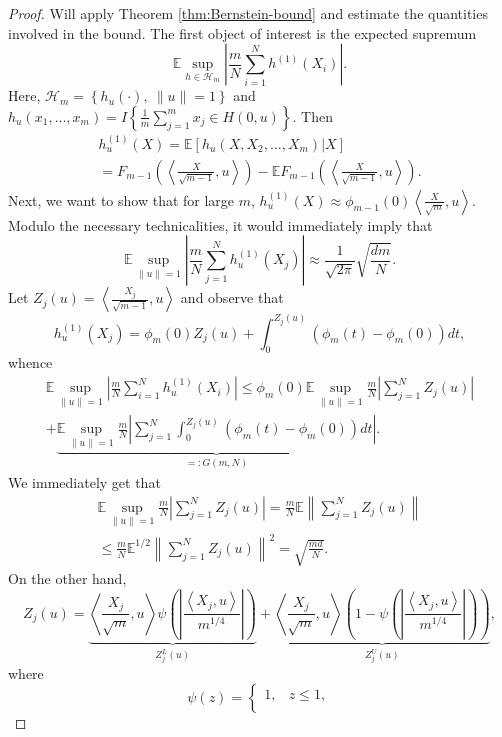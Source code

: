 \documentclass[12pt]{article}
\def\l{\left}
\def\r{\right}
\newcommand{\m}{\mathcal}
\newcommand{\mb}{\mathbb}
\newcommand{\dotp}[2]{\left\langle#1,#2\right\rangle}
\theoremstyle{thmstyletwo}%
\theoremstyle{thmstylethree}%
\begin{document}
\begin{proof}
    Will apply Theorem \ref{thm:Bernstein-bound} and estimate the quantities involved in the bound. The first object of interest is the expected supremum
    \[
    \mb E\sup_{h\in \m H_m}\l|\frac{m}{N} \sum_{i=1}^N h^{(1)}\l(X_i\r)\r|. 
    \]
    Here, $\m H_m = \l\{ h_u(\cdot), \ \|u\|=1\r\}$ and $h_u(x_1,\ldots,x_m) = I\l\{\frac{1}{m}\sum_{j=1}^m x_j\in H(0,u) \r\}$. Then 
    \begin{multline*}
    h^{(1)}_u(X) = \mb E\l[ h_u(X,X_2,\ldots,X_m) | X\r]
    \\
    = F_{m-1}\l( \dotp{\frac{X}{\sqrt{m-1}}}{u}\r) - \mb E F_{m-1}\l( \dotp{\frac{X}{\sqrt{m-1}}}{u}\r).
    \end{multline*}
    Next, we want to show that for large $m$, $h^{(1)}_u(X) \approx \phi_{m-1}(0)\dotp{\frac{X}{\sqrt m}}{u}$. Modulo the necessary technicalities, it would immediately imply that 
    \[
    \mb E\sup_{\|u\|=1} \l|\frac{m}{N} \sum_{j=1}^N h_u^{(1)}\l(X_j\r)\r| \approx \frac{1}{\sqrt{2\pi}}\sqrt{\frac{dm}{N}}.
    \]
    Let $Z_j(u) = \dotp{\frac{X_j}{\sqrt{m-1}}}{u}$ and observe that 
    \[
    h_u^{(1)}(X_j) = \phi_m(0) Z_j(u) + \int_0^{Z_j(u)} (\phi_m(t) - \phi_m(0))dt,
    \]
    whence 
    \begin{multline*}
    \mb E\sup_{\|u\|=1}\l|\frac{m}{N} \sum_{i=1}^N h_u^{(1)}\l(X_i\r)\r| \leq 
    \phi_m(0)\mb E\sup_{\|u\|=1} \frac{m}{N}\l| \sum_{j=1}^N Z_j(u)\r|
    \\
    + \underbrace{\mb E\sup_{\|u\|=1} \frac{m}{N}\l| \sum_{j=1}^N \int_0^{Z_j(u)} (\phi_m(t) - \phi_m(0))dt\r|}_{=:G(m,N)}.
    \end{multline*}
    We immediately get that 
    \begin{multline*}
    \mb E\sup_{\|u\|=1} \frac{m}{N}\l| \sum_{j=1}^N Z_j(u)\r| = 
    \frac{m}{N}\mb E \l\| \sum_{j=1}^N Z_j(u)\r\| 
    \\
    \leq \frac{m}{N}\mb E^{1/2} \l\| \sum_{j=1}^N Z_j(u)\r\|^2 
    = \sqrt{\frac{md}{N}}.
    \end{multline*}
On the other hand, 
\begin{equation}
    \label{eq:z-decomposition}
Z_j(u) = \underbrace{\dotp{\frac{X_j}{\sqrt{m}}}{u}\psi\l(\l|\frac{\dotp{X_j}{u}}{m^{1/4}}\r| \r)}_{Z_j^L(u)} + \underbrace{\dotp{\frac{X_j}{\sqrt{m}}}{u}\l( 1-\psi\l(\l|\frac{\dotp{X_j}{u}}{m^{1/4}}\r| \r)\r)}_{Z_j^U(u)},
\end{equation}
where 
\[
\psi(z) = \begin{cases}
    1, & z\leq 1, \\

\end{cases}\]
\end{proof}
\end{document}
